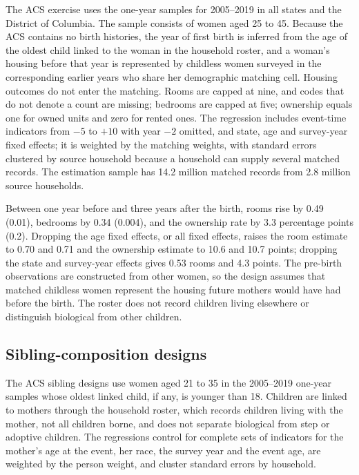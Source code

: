 The ACS exercise uses the one-year samples for 2005--2019 in all states and
the District of Columbia. The sample consists of women aged 25 to 45. Because
the ACS contains no birth histories, the year of first birth is inferred from
the age of the oldest child linked to the woman in the household roster, and a
woman's housing before that year is represented by childless women surveyed in
the corresponding earlier years who share her demographic matching cell.
Housing outcomes do not enter the matching. Rooms are capped at nine, and codes
that do not denote a count are missing; bedrooms are capped at five; ownership
equals one for owned units and zero for rented ones. The regression includes
event-time indicators from $-5$ to $+10$ with year $-2$ omitted, and state, age
and survey-year fixed effects; it is weighted by the matching weights, with
standard errors clustered by source household because a household can supply
several matched records. The estimation sample has 14.2 million matched
records from 2.8 million source households.

Between one year before and three years after the birth, rooms rise by 0.49
(0.01), bedrooms by 0.34 (0.004), and the ownership rate by 3.3 percentage
points (0.2). Dropping the age fixed effects, or all fixed effects, raises the
room estimate to 0.70 and 0.71 and the ownership estimate to 10.6 and 10.7
points; dropping the state and survey-year effects gives 0.53 rooms and 4.3
points. The pre-birth observations are constructed from other
women, so the design assumes that matched childless women represent the
housing future mothers would have had before the birth. The roster does not
record children living elsewhere or distinguish biological from other
children.

\subsection{Sibling-composition designs}

The ACS sibling designs use women aged 21 to 35 in the 2005--2019 one-year
samples whose oldest linked child, if any, is younger than 18. Children are
linked to mothers through the household roster, which records children living
with the mother, not all children borne, and does not separate biological from
step or adoptive children. The regressions control for complete sets of
indicators for the mother's age at the event, her race, the survey year and
the event age, are weighted by the person weight, and cluster standard errors
by household.


